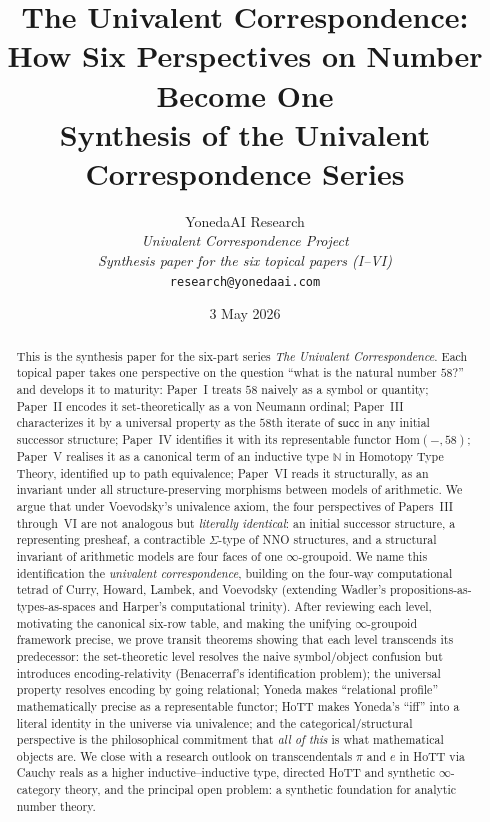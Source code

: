 \documentclass[12pt]{article}
\title{The Univalent Correspondence: \\
How Six Perspectives on Number Become One \\
\large Synthesis of the Univalent Correspondence Series}
\author{YonedaAI Research \\
\textit{Univalent Correspondence Project} \\
\textit{Synthesis paper for the six topical papers (I--VI)} \\
\texttt{research@yonedaai.com}}
\date{3 May 2026}
\theoremstyle{definition}
\theoremstyle{remark}
\newcommand{\N}{\mathbb{N}}
\newcommand{\Hom}{\mathrm{Hom}}
\newcommand{\suc}{\mathsf{succ}}
\begin{document}
\maketitle

\begin{abstract}
This is the synthesis paper for the six-part series \emph{The Univalent
Correspondence}. Each topical paper takes one perspective on the question
``what is the natural number $58$?'' and develops it to maturity: Paper~I
treats $58$ naively as a symbol or quantity; Paper~II encodes it
set-theoretically as a von Neumann ordinal; Paper~III characterizes it by a
universal property as the $58$th iterate of $\suc$ in any initial successor
structure; Paper~IV identifies it with its representable functor
$\Hom(-, 58)$; Paper~V realises it as a canonical term of an inductive type
$\N$ in Homotopy Type Theory, identified up to path equivalence; Paper~VI
reads it structurally, as an invariant under all structure-preserving
morphisms between models of arithmetic. We argue that under Voevodsky's
univalence axiom, the four perspectives of Papers~III through~VI are not
analogous but \emph{literally identical}: an initial successor structure, a
representing presheaf, a contractible $\Sigma$-type of NNO structures, and a
structural invariant of arithmetic models are four faces of one
$\infty$-groupoid. We name this identification the \emph{univalent
correspondence}, building on the four-way computational tetrad of Curry,
Howard, Lambek, and Voevodsky (extending Wadler's
propositions-as-types-as-spaces and Harper's computational trinity). After
reviewing each level, motivating the canonical six-row table, and making the
unifying $\infty$-groupoid framework precise, we prove transit theorems
showing that each level transcends its predecessor: the set-theoretic level
resolves the naive symbol/object confusion but introduces
encoding-relativity (Benacerraf's identification problem); the universal
property resolves encoding by going relational; Yoneda makes ``relational
profile'' mathematically precise as a representable functor; HoTT makes
Yoneda's ``iff'' into a literal identity in the universe via univalence;
and the categorical/structural perspective is the philosophical commitment
that \emph{all of this} is what mathematical objects are. We close with a
research outlook on transcendentals $\pi$ and $e$ in HoTT via Cauchy reals
as a higher inductive--inductive type, directed HoTT and synthetic
$\infty$-category theory, and the principal open problem: a synthetic
foundation for analytic number theory.
\end{abstract}
\end{document}
